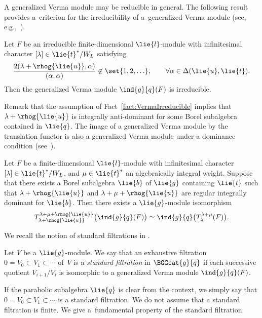 A generalized Verma module may be reducible in general.
The following result provides a~criterion for the irreducibility of a~generalized Verma module (see, e.g.,~\cite[Theorem~9.12]{Hu08_category_o}).
\begin{Fact}\label{fact:VermaIrreducible}
	Let $F$ be an irreducible finite-dimensional $\lie{l}$-module with infinitesimal character $[\lambda] \in \lie{t}^*/W_L$ satisfying
	\begin{align*}
		\frac{2(\lambda+\rhog{\lie{u}}, \alpha)}{(\alpha, \alpha)} \not \in \set{1, 2, \ldots}, \qquad \forall \alpha \in \Delta(\lie{u}, \lie{t}).
	\end{align*}
	Then the generalized Verma module $\ind{g}{q}(F)$ is irreducible.
\end{Fact}

Remark that the assumption of Fact~\ref{fact:VermaIrreducible} implies that $\lambda + \rhog{\lie{u}}$ is integrally anti-dominant for some Borel subalgebra contained in $\lie{q}$.
The image of a generalized Verma module by the translation functor is also a generalized Verma module under a dominance condition (see~\cite[Theorem~7.237]{KnVo95_cohomological_induction}).

\begin{Fact}\label{fact:TranslationVerma}
	Let $F$ be a finite-dimensional $\lie{l}$-module with infinitesimal character $[\lambda] \in \lie{t}^* / W_L$,
	and $\mu \in \lie{t}^*$ an algebraically integral weight.
	Suppose that there exists a Borel subalgebra $\lie{b}$ of $\lie{g}$ containing $\lie{t}$ such that $\lambda+\rhog{\lie{u}}$ and $\lambda+\mu+\rhog{\lie{u}}$ are regular integrally dominant for $\lie{b}$.
	Then there exists a $\lie{g}$-module isomorphism
	\begin{align*}
		T_{\lambda+\rhog{\lie{u}}}^{\lambda+\mu+\rhog{\lie{u}}}\bigl(\ind{g}{q}(F)\bigr)
		\simeq \ind{g}{q}\bigl(T_{\lambda}^{\lambda+\mu}(F)\bigr).
	\end{align*}
\end{Fact}

We recall the notion of standard filtrations in \cite[Section~9.8]{Hu08_category_o}.
\begin{Definition}\label{def:StandardFiltration}
	Let $V$ be a $\lie{g}$-module.
	We say that an exhaustive filtration $0=V_0 \subset V_1 \subset \cdots$ of~$V$ is a \emph{standard filtration} in $\BGGcat{g}{q}$ if each successive quotient $V_{i+1}/{V_{i}}$ is isomorphic to a generalized Verma module
	$\ind{g}{q}(F)$.
\end{Definition}
If the parabolic subalgebra $\lie{q}$ is clear from the context,
we simply say that ${0=V_0 \subset V_1 \subset \cdots}$ is a standard filtration.
We do not assume that a standard filtration is finite.
We give a~fundamental property of the standard filtration.

